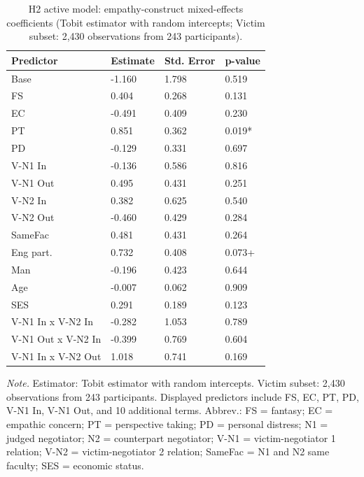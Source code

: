 \documentclass[11pt]{article}
\begin{document}
\begin{table}[H]
\centering
{\fontsize{11}{13}\selectfont
\renewcommand{\arraystretch}{1.10}
\caption{H2 active model: empathy-construct mixed-effects coefficients (Tobit estimator with random intercepts; Victim subset: 2,430 observations from 243 participants).}
\label{tab:h2_b_victim}
\begin{tabularx}{\textwidth}{>{\raggedright\arraybackslash}Xlll}
\toprule
Predictor & Estimate & Std. Error & p-value \\
\midrule
Base & -1.160 & 1.798 & 0.519 \\
FS & 0.404 & 0.268 & 0.131 \\
EC & -0.491 & 0.409 & 0.230 \\
PT & 0.851 & 0.362 & 0.019* \\
PD & -0.129 & 0.331 & 0.697 \\
V-N1 In & -0.136 & 0.586 & 0.816 \\
V-N1 Out & 0.495 & 0.431 & 0.251 \\
V-N2 In & 0.382 & 0.625 & 0.540 \\
V-N2 Out & -0.460 & 0.429 & 0.284 \\
SameFac & 0.481 & 0.431 & 0.264 \\
Eng part. & 0.732 & 0.408 & 0.073+ \\
Man & -0.196 & 0.423 & 0.644 \\
Age & -0.007 & 0.062 & 0.909 \\
SES & 0.291 & 0.189 & 0.123 \\
V-N1 In x V-N2 In & -0.282 & 1.053 & 0.789 \\
V-N1 Out x V-N2 In & -0.399 & 0.769 & 0.604 \\
V-N1 In x V-N2 Out & 1.018 & 0.741 & 0.169 \\
\bottomrule
\end{tabularx}
}
\end{table}
\begin{flushleft}
\footnotesize\textit{Note.} Estimator: Tobit estimator with random intercepts. Victim subset: 2,430 observations from 243 participants. Displayed predictors include FS, EC, PT, PD, V-N1 In, V-N1 Out, and 10 additional terms. Abbrev.: FS = fantasy; EC = empathic concern; PT = perspective taking; PD = personal distress; N1 = judged negotiator; N2 = counterpart negotiator; V-N1 = victim-negotiator 1 relation; V-N2 = victim-negotiator 2 relation; SameFac = N1 and N2 same faculty; SES = economic status.
\end{flushleft}
\end{document}
